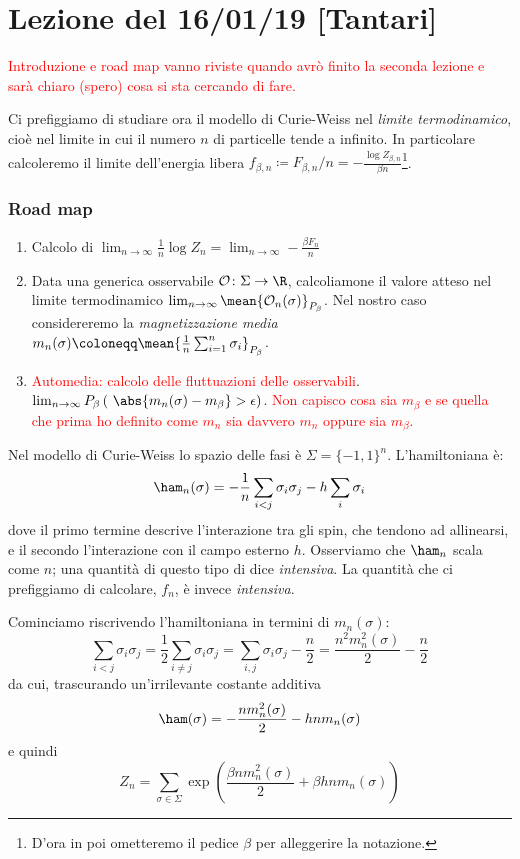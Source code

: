 \section{Lezione del 16/01/19 [Tantari]}
\textcolor{red}{Introduzione e road map vanno riviste quando avrò finito la seconda lezione e sarà chiaro (spero) cosa si sta cercando di fare.}

Ci prefiggiamo di studiare ora il modello di Curie-Weiss nel \emph{limite termodinamico}, cioè nel limite in cui il numero $ n $ di particelle tende a infinito. In particolare calcoleremo il limite dell'energia libera $ f_{\beta, n} \coloneqq F_{\beta, n}/n = -\frac{\log Z_{\beta, n}}{\beta n}$\footnote{D'ora in poi ometteremo il pedice $ \beta $ per alleggerire la notazione.}.

\subsubsection{Road map}
\begin{enumerate}
  \item Calcolo di $ \lim_{n\to\infty} \frac{1}{n} \log{Z_n} = \lim_{n\to\infty} -\frac{\beta F_n}{n} $
  \item Data una generica osservabile $ \mathcal{O}\colon\Sigma\to\R $, calcoliamone il valore atteso nel limite termodinamico $ \lim_{n\to\infty} \mean{\mathcal{O}_n(\sigma)}_{P_\beta} $. Nel nostro caso considereremo la \emph{magnetizzazione media} $ m_n(\sigma) \coloneqq \mean{\frac{1}{n}\sum_{i=1}^{n}\sigma_i}_{P_\beta} $.
  \item \textcolor{red}{Automedia: calcolo delle fluttuazioni delle osservabili}.
  $ \lim_{n\to\infty} P_\beta\left(\ \abs{m_n(\sigma) - m_\beta } > \epsilon \right) $.
  \textcolor{red}{Non capisco cosa sia $ m_\beta $ e se quella che prima ho definito come $ m_n $ sia davvero $ m_n $ oppure sia $ m_\beta $.}
\end{enumerate}

Nel modello di Curie-Weiss lo spazio delle fasi è $ \Sigma = \{-1,1\}^n $. L'hamiltoniana è:
\[ \ham_n(\sigma) = -\frac{1}{n} \sum_{i<j} \sigma_i \sigma_j - h \sum_i \sigma_i \]
dove il primo termine descrive l'interazione tra gli spin, che tendono ad allinearsi, e il secondo l'interazione con il campo esterno $ h $. Osserviamo che $ \ham_n $ scala come $ n $; una quantità di questo tipo di dice \emph{intensiva}. La quantità che ci prefiggiamo di calcolare, $ f_n $, è invece \emph{intensiva}.

Cominciamo riscrivendo l'hamiltoniana in termini di $ m_n(\sigma) $:
\[ \sum_{i<j} \sigma_i \sigma_j = \frac{1}{2} \sum_{i \neq j} \sigma_i \sigma_j = \sum_{i,j} \sigma_i \sigma_j -\frac{n}{2} = \frac{n^2 m_n^2(\sigma)}{2} - \frac{n}{2} \]
da cui, trascurando un'irrilevante costante additiva
\[ \ham(\sigma) = -\frac{n m_n^2(\sigma)}{2} - hnm_n(\sigma) \]
e quindi
\[ Z_n = \sum_{\sigma \in \Sigma} \exp\left( \frac{\beta n m_n^2(\sigma)}{2} + \beta h n m_n(\sigma) \right) \]

